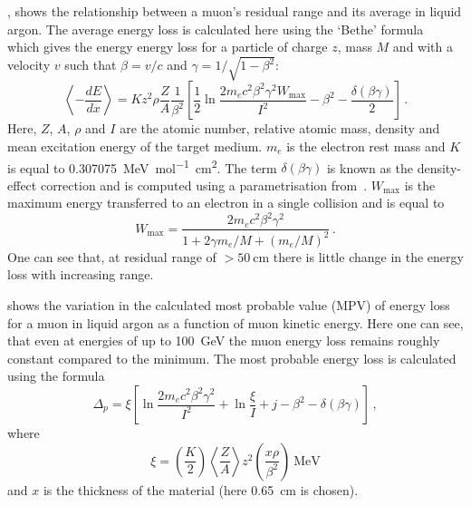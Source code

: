 , shows the relationship between a muon's residual range and its average \dedx in liquid argon.
The average energy loss is calculated here using the `Bethe' formula~\cite{pdg2018} which gives the energy energy loss for a particle of charge $z$, mass $M$ and with a velocity $v$ such that $\beta = v / c$ and $\gamma = 1 / \sqrt{1 - \beta^{2}}$:
\begin{equation}
	\left< -\frac{dE}{dx} \right> = K z^{2} \rho \frac{Z}{A} \frac{1}{\beta^{2}} 
	\left[ \frac{1}{2} \ln \frac{2m_{e}c^{2} \beta^{2} \gamma^{2} W_{\text{max}}}{I^{2}} - \beta^{2} - \frac{\delta (\beta \gamma)}{2} \right] \, .
\end{equation}
Here, $Z$, $A$, $\rho$ and $I$ are the atomic number, relative atomic mass, density and mean excitation energy of the target medium.
$m_{e}$ is the electron rest mass and $K$ is equal to \SI{0.307075}{\MeV\per\mole\square\cm}.
The term $\delta(\beta\gamma)$ is known as the density-effect correction and is computed using a parametrisation from~\cite{densityEffect}.
$W_{\text{max}}$ is the maximum energy transferred to an electron in a single collision and is equal to 
\begin{equation}
	W_{\text{max}} =  \frac{ 2 m_{e} c^{2} \beta^{2} \gamma^{2} }{ 1 + 2\gamma m_{e}/M + (m_{e}/M)^{2} } \, .
\end{equation}
One can see that, at residual range of $>\SI{50}{\cm}$ there is little change in the energy loss with increasing range.

 shows the variation in the calculated most probable value (MPV) of energy loss for a muon in liquid argon as a function of muon kinetic energy.
Here one can see, that even at energies of up to \SI{100}{\GeV} the muon energy loss remains roughly constant compared to the minimum.
The most probable energy loss is calculated using the formula~\cite{mpvELoss}
\begin{equation}
	\Delta_{p} = \xi \left[ \ln \frac{2m_{e}c^{2} \beta^{2} \gamma^{2}}{I^{2}} +
	\ln \frac{\xi}{I} + j - \beta^{2} - \delta(\beta\gamma) \right] \, ,
\end{equation}
where 
\begin{equation}
	\xi = \left( \frac{K}{2} \right) \left< \frac{Z}{A} \right> z^{2} \left( \frac{x\rho}{\beta^{2}} \right)~\text{MeV}
\end{equation}
and $x$ is the thickness of the material (here \SI{0.65}{\cm} is chosen).

